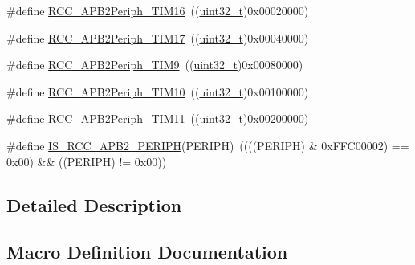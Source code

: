 \begin{DoxyCompactItemize}
\item 
\#define \hyperlink{group___a_p_b2__peripheral_ga739d0a5fe583f07f5b6fa320f2d2e53a}{R\+C\+C\+\_\+\+A\+P\+B2\+Periph\+\_\+\+T\+I\+M16}~((\hyperlink{_p_e___types_8h_a33594304e786b158f3fb30289278f5af}{uint32\+\_\+t})0x00020000)
\item 
\#define \hyperlink{group___a_p_b2__peripheral_ga5a6217b6200d6679dc7bee4522d6038a}{R\+C\+C\+\_\+\+A\+P\+B2\+Periph\+\_\+\+T\+I\+M17}~((\hyperlink{_p_e___types_8h_a33594304e786b158f3fb30289278f5af}{uint32\+\_\+t})0x00040000)
\item 
\#define \hyperlink{group___a_p_b2__peripheral_ga24d0145dc172bc27ed580770cf15e4d9}{R\+C\+C\+\_\+\+A\+P\+B2\+Periph\+\_\+\+T\+I\+M9}~((\hyperlink{_p_e___types_8h_a33594304e786b158f3fb30289278f5af}{uint32\+\_\+t})0x00080000)
\item 
\#define \hyperlink{group___a_p_b2__peripheral_ga75069120ecbe86920b39c2b75c909438}{R\+C\+C\+\_\+\+A\+P\+B2\+Periph\+\_\+\+T\+I\+M10}~((\hyperlink{_p_e___types_8h_a33594304e786b158f3fb30289278f5af}{uint32\+\_\+t})0x00100000)
\item 
\#define \hyperlink{group___a_p_b2__peripheral_gaba591104f4e31b1e8ce98c269035850f}{R\+C\+C\+\_\+\+A\+P\+B2\+Periph\+\_\+\+T\+I\+M11}~((\hyperlink{_p_e___types_8h_a33594304e786b158f3fb30289278f5af}{uint32\+\_\+t})0x00200000)
\item 
\#define \hyperlink{group___a_p_b2__peripheral_ga89a2b95e60e90a51b26b53cc4c0e7b14}{I\+S\+\_\+\+R\+C\+C\+\_\+\+A\+P\+B2\+\_\+\+P\+E\+R\+I\+PH}(P\+E\+R\+I\+PH)~((((P\+E\+R\+I\+PH) \& 0x\+F\+F\+C00002) == 0x00) \&\& ((\+P\+E\+R\+I\+P\+H) != 0x00))
\end{DoxyCompactItemize}


\subsection{Detailed Description}


\subsection{Macro Definition Documentation}
